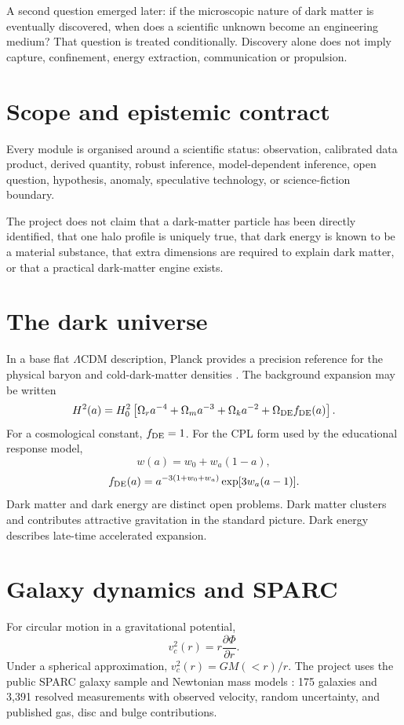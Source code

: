 \documentclass[11pt,a4paper]{article}
\begin{document}
A second question emerged later: if the microscopic nature of dark matter is eventually discovered, when does a scientific unknown become an engineering medium? That question is treated conditionally. Discovery alone does not imply capture, confinement, energy extraction, communication or propulsion.

\section{Scope and epistemic contract}
Every module is organised around a scientific status: observation, calibrated data product, derived quantity, robust inference, model-dependent inference, open question, hypothesis, anomaly, speculative technology, or science-fiction boundary.

The project does not claim that a dark-matter particle has been directly identified, that one halo profile is uniquely true, that dark energy is known to be a material substance, that extra dimensions are required to explain dark matter, or that a practical dark-matter engine exists.

\section{The dark universe}
In a base flat $\Lambda$CDM description, Planck provides a precision reference for the physical baryon and cold-dark-matter densities \parencite{Planck2020}. The background expansion may be written
\begin{equation}
H^2(a)=H_0^2\left[\Omega_r a^{-4}+\Omega_m a^{-3}+\Omega_k a^{-2}+\Omega_{\rm DE}f_{\rm DE}(a)\right].
\end{equation}
For a cosmological constant, $f_{\rm DE}=1$. For the CPL form used by the educational response model,
\begin{equation}
w(a)=w_0+w_a(1-a),
\end{equation}
\begin{equation}
f_{\rm DE}(a)=a^{-3(1+w_0+w_a)}\exp[3w_a(a-1)].
\end{equation}
Dark matter and dark energy are distinct open problems. Dark matter clusters and contributes attractive gravitation in the standard picture. Dark energy describes late-time accelerated expansion.

\section{Galaxy dynamics and SPARC}
For circular motion in a gravitational potential,
\begin{equation}
v_c^2(r)=r\frac{\partial\Phi}{\partial r}.
\end{equation}
Under a spherical approximation, $v_c^2(r)=GM(<r)/r$. The project uses the public SPARC galaxy sample and Newtonian mass models \parencite{Lelli2016}: 175 galaxies and 3,391 resolved measurements with observed velocity, random uncertainty, and published gas, disc and bulge contributions.
\end{document}
